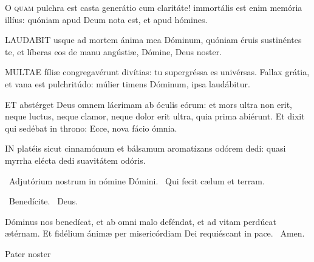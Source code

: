 
\lettrine[lines=2]{O}{} \textsc{quam} pulchra est casta generátio cum claritáte! immortális est enim memória illíus: quóniam apud Deum nota est, et apud hómines.


\lettrine[lines=2]{L}{AUDABIT} usque ad mortem ánima mea Dóminum, quóniam éruis sustinéntes te, et líberas eos de manu angústiæ, Dómine, Deus noster.


\lettrine[lines=2]{M}{ULTAE} fíliæ congregavérunt divítias: tu supergréssa es univérsas. Fallax grátia, et vana est pulchritúdo: múlier timens Dóminum, ipsa laudábitur.


\lettrine[lines=2]{E}{T} abstérget Deus omnem lácrimam ab óculis eórum: et mors ultra non erit, neque luctus, neque clamor, neque dolor erit ultra, quia prima abiérunt. Et dixit qui sedébat in throno: Ecce, nova fácio ómnia.


\lettrine[lines=2]{I}{N} platéis sicut cinnamómum et bálsamum aromatízans odórem dedi: quasi myrrha elécta dedi suavitátem odóris.

\V\ Adjutórium nostrum in nómine Dómini. \R\ Qui fecit cælum et terram.

\V\ Benedícite. \R\ Deus.

 Dóminus nos benedícat, et ab omni malo deféndat, et ad vitam perdúcat ætérnam. Et fidélium ánimæ per misericórdiam Dei requiéscant in pace. \R\ Amen.

 Pater noster 


